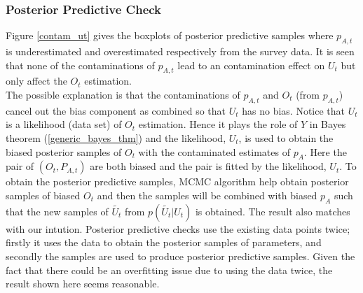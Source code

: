 \documentclass[12pt]{article}
\begin{document}
{\subsubsection{Posterior Predictive Check}

Figure \ref{contam_ut} gives the boxplots of posterior predictive samples where $p_{A,t}$ is underestimated and overestimated respectively from the survey data. It is seen that none of the contaminations of $p_{A,t}$ lead to an contamination effect on $U_t$ but only affect the $O_t$ estimation.\\

The possible explanation is that the contaminations of  $p_{A,t}$ and $O_t$ (from $p_{A,t}$) cancel out the bias component as combined so that $U_t$ has no bias. Notice that $U_t$ is a likelihood (data set) of $O_t$ estimation. Hence it plays the role of $Y$ in Bayes theorem (\ref{generic_bayes_thm}) and the likelihood, $U_t$, is used to obtain the biased posterior samples of $O_t$ with the contaminated estimates of $p_A$. Here the pair of $(O_t, P_{A,t})$ are both biased and the pair is fitted by the likelihood, $U_t$. To obtain the posterior predictive samples, MCMC algorithm help obtain posterior samples of biased $O_t$ and then the samples will be combined with biased $p_A$ such that the new samples of $\tilde{U_t}$ from $p(\tilde{U_t}|{U_t})$ is obtained.  The result also matches with our intution. Posterior predictive checks use the existing data points twice; firstly it uses the data to obtain the posterior samples of parameters, and secondly the samples are used to produce posterior predictive samples. Given the fact that there could be an overfitting issue due to using the data twice, the result shown here seems reasonable. 
\\

}
\end{document}
